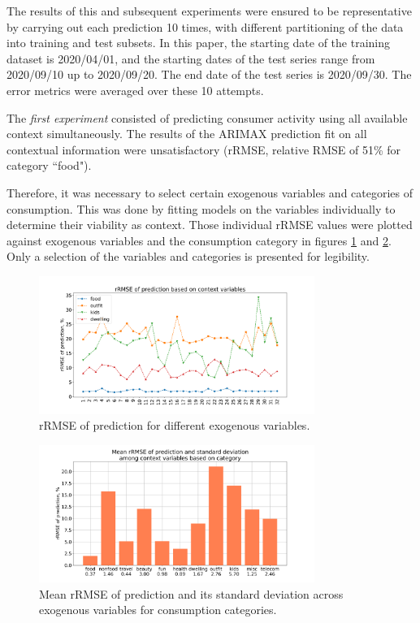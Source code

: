 \documentclass[13pt, a4paper]{article}
\begin{document}
The results of this and subsequent experiments were ensured to be representative by carrying out each prediction 10 times, with different partitioning of the data into training and test subsets. In this paper, the starting date of the training dataset is 2020/04/01, and the starting dates of the test series range from 2020/09/10 up to 2020/09/20. The end date of the test series is 2020/09/30. The error metrics were averaged over these 10 attempts. 

The \textit{first experiment} consisted of predicting consumer activity using all available context simultaneously. The results of the ARIMAX prediction fit on all contextual information were unsatisfactory (rRMSE, relative RMSE of 51\% for category ``food"). 

Therefore, it was necessary to select certain exogenous variables and categories of consumption. This was done by fitting models on the variables individually to determine their viability as context. Those individual rRMSE values were plotted against exogenous variables and the consumption category in figures \ref{fig:gr10} and \ref{fig:gr11}. Only a selection of the variables and categories is presented for legibility.

\begin{figure}[h!]\vspace*{4pt}
\centerline{\includegraphics[width=0.8\textwidth]{./visuals/gr10.png}}
\caption{rRMSE of prediction for different exogenous variables.}
\label{fig:gr10}
\end{figure}

\begin{figure}[h!]\vspace*{4pt}
\centerline{\includegraphics[width=0.8\textwidth]{./visuals/gr11.png}}
\caption{Mean rRMSE of prediction and its standard deviation across exogenous variables for consumption categories.}
\label{fig:gr11}
\end{figure}
\end{document}
